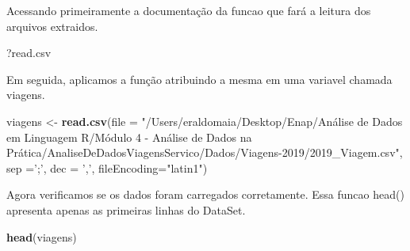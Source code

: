 \documentclass[
]{article}
\newenvironment{Shaded}{\begin{snugshade}}{\end{snugshade}}
\newcommand{\DataTypeTok}[1]{\textcolor[rgb]{0.13,0.29,0.53}{#1}}
\newcommand{\KeywordTok}[1]{\textcolor[rgb]{0.13,0.29,0.53}{\textbf{#1}}}
\newcommand{\NormalTok}[1]{#1}
\newcommand{\StringTok}[1]{\textcolor[rgb]{0.31,0.60,0.02}{#1}}
\begin{document}
Acessando primeiramente a documentação da funcao que fará a leitura dos
arquivos extraidos.

\begin{Shaded}
\begin{Highlighting}[]
\NormalTok{?read.csv}
\end{Highlighting}
\end{Shaded}

Em seguida, aplicamos a função atribuindo a mesma em uma variavel
chamada viagens.

\begin{Shaded}
\begin{Highlighting}[]
\NormalTok{viagens <-}\StringTok{ }\KeywordTok{read.csv}\NormalTok{(}\DataTypeTok{file =} \StringTok{"/Users/eraldomaia/Desktop/Enap/Análise de Dados em Linguagem R/Módulo 4 - Análise de Dados na Prática/AnaliseDeDadosViagensServico/Dados/Viagens-2019/2019_Viagem.csv"}\NormalTok{, }\DataTypeTok{sep =}\StringTok{';'}\NormalTok{, }\DataTypeTok{dec =} \StringTok{','}\NormalTok{, }\DataTypeTok{fileEncoding=}\StringTok{"latin1"}\NormalTok{)}
\end{Highlighting}
\end{Shaded}

Agora verificamos se os dados foram carregados corretamente. Essa funcao
head() apresenta apenas as primeiras linhas do DataSet.

\begin{Shaded}
\begin{Highlighting}[]
\KeywordTok{head}\NormalTok{(viagens)}
\end{Highlighting}
\end{Shaded}
\end{document}
